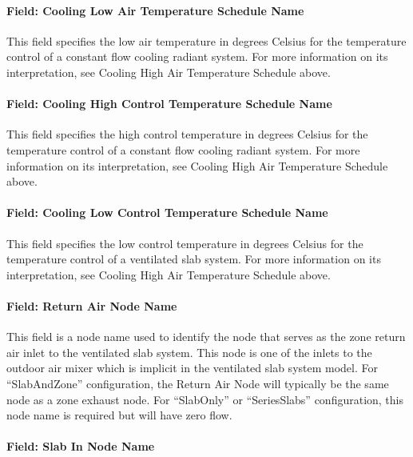 \paragraph{Field: Cooling Low Air Temperature Schedule Name}\label{field-cooling-low-air-temperature-schedule-name}

This field specifies the low air temperature in degrees Celsius for the temperature control of a constant flow cooling radiant system. For more information on its interpretation, see Cooling High Air Temperature Schedule above.

\paragraph{Field: Cooling High Control Temperature Schedule Name}\label{field-cooling-high-control-temperature-schedule-name-1}

This field specifies the high control temperature in degrees Celsius for the temperature control of a constant flow cooling radiant system. For more information on its interpretation, see Cooling High Air Temperature Schedule above.

\paragraph{Field: Cooling Low Control Temperature Schedule Name}\label{field-cooling-low-control-temperature-schedule-name-1}

This field specifies the low control temperature in degrees Celsius for the temperature control of a ventilated slab system. For more information on its interpretation, see Cooling High Air Temperature Schedule above.

\paragraph{Field: Return Air Node Name}\label{field-return-air-node-name-000}

This field is a node name used to identify the node that serves as the zone return air inlet to the ventilated slab system. This node is one of the inlets to the outdoor air mixer which is implicit in the ventilated slab system model. For ``SlabAndZone'' configuration, the Return Air Node will typically be the same node as a zone exhaust node. For ``SlabOnly'' or ``SeriesSlabs'' configuration, this node name is required but will have zero flow.

\paragraph{Field: Slab In Node Name}\label{field-slab-in-node-name}

